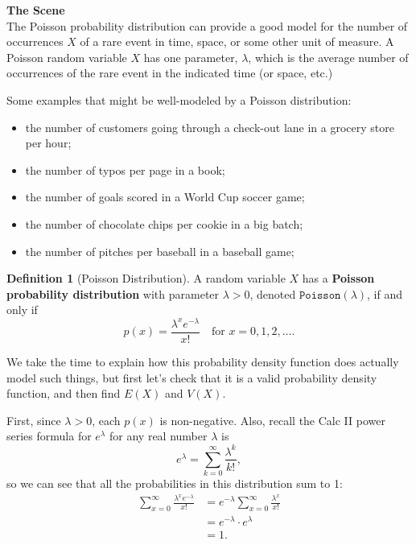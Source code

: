 \documentclass[
]{book}
\providecommand{\tightlist}{%
  \setlength{\itemsep}{0pt}\setlength{\parskip}{0pt}}
\theoremstyle{definition}
\newtheorem{definition}{Definition}[chapter]
\theoremstyle{definition}
\theoremstyle{definition}
\theoremstyle{definition}
\theoremstyle{remark}
\begin{document}
\textbf{The Scene}\\
The Poisson probability distribution can provide a good model for the number of occurrences \(X\) of a rare event in time, space, or some other unit of measure. A Poisson random variable \(X\) has one parameter, \(\lambda\), which is the average number of occurrences of the rare event in the indicated time (or space, etc.)

Some examples that might be well-modeled by a Poisson distribution:

\begin{itemize}
\tightlist
\item
  the number of customers going through a check-out lane in a grocery store per hour;
\item
  the number of typos per page in a book;
\item
  the number of goals scored in a World Cup soccer game;
\item
  the number of chocolate chips per cookie in a big batch;
\item
  the number of pitches per baseball in a baseball game;
\end{itemize}

\begin{definition}[Poisson Distribution]
\protect\hypertarget{def:poisson-distribution}{}\label{def:poisson-distribution}A random variable \(X\) has a \textbf{Poisson probability distribution} with parameter \(\lambda > 0\), denoted \(\texttt{Poisson}(\lambda)\), if and only if \[p(x) = \frac{\lambda^x e^{-\lambda}}{x!} ~~~\text{ for } x = 0,1,2, \ldots.\]
\end{definition}

We take the time to explain how this probability density function does actually model such things, but first let's check that it is a valid probability density function, and then find \(E(X)\) and \(V(X)\).

First, since \(\lambda > 0\), each \(p(x)\) is non-negative. Also, recall the Calc II power series formula for \(e^\lambda\) for any real number \(\lambda\) is \[e^\lambda = \sum_{k=0}^\infty \frac{\lambda^k}{k!},\] so we can see that all the probabilities in this distribution sum to 1:
\begin{align*}
\sum_{x=0}^\infty \frac{\lambda^x e^{-\lambda}}{x!} &= e^{-\lambda} \sum_{x=0}^\infty \frac{\lambda^x}{x!} \\
&= e^{-\lambda}\cdot e^{\lambda} \\
&= 1.
\end{align*}
\end{document}
